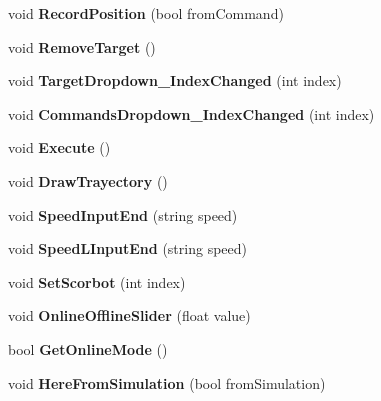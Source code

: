 \begin{DoxyCompactItemize}
void {\bfseries Record\+Position} (bool from\+Command)
\item 
\mbox{\label{class_game_controller_ad8f76a41d0163fd06971dffce1d61c97}} 
void {\bfseries Remove\+Target} ()
\item 
\mbox{\label{class_game_controller_a6de8761e6cd2b07a857ea3ec0544fa40}} 
void {\bfseries Target\+Dropdown\+\_\+\+Index\+Changed} (int index)
\item 
\mbox{\label{class_game_controller_a2ea8f0a42452c5dd938feed2713f87c7}} 
void {\bfseries Commands\+Dropdown\+\_\+\+Index\+Changed} (int index)
\item 
\mbox{\label{class_game_controller_ac1dcb5c2f0422f5568ca776dd5cd7b7c}} 
void {\bfseries Execute} ()
\item 
\mbox{\label{class_game_controller_afd55aa0db0046a73a2b9bb57dc56d373}} 
void {\bfseries Draw\+Trayectory} ()
\item 
\mbox{\label{class_game_controller_a7a993b5ee6e6376f81670d3958d48bb6}} 
void {\bfseries Speed\+Input\+End} (string speed)
\item 
\mbox{\label{class_game_controller_aa10e8ec20019adfd8f3c2dfbea4ff8bc}} 
void {\bfseries Speed\+L\+Input\+End} (string speed)
\item 
\mbox{\label{class_game_controller_aa448386fb4d83ff0ca9211424ad6b020}} 
void {\bfseries Set\+Scorbot} (int index)
\item 
\mbox{\label{class_game_controller_a48800115bee7dd138485ca7cd1464f78}} 
void {\bfseries Online\+Offline\+Slider} (float value)
\item 
\mbox{\label{class_game_controller_ab8bc597c4e47a3cece068762cdfaf33a}} 
bool {\bfseries Get\+Online\+Mode} ()
\item 
\mbox{\label{class_game_controller_a6ac352c2a0b3dafb1da0a71fb047736e}} 
void {\bfseries Here\+From\+Simulation} (bool from\+Simulation)

\end{DoxyCompactItemize}

